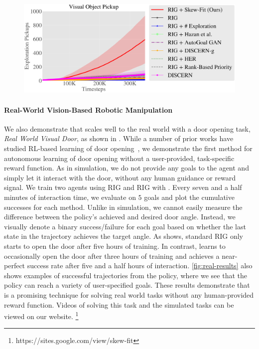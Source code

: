 \begin{figure}[t]
\centering
  \includegraphics[width=\linewidth]{skewfit/figures/plots/exploration_pickups.pdf}
  \label{fig:exploration_pickups}
\end{figure}


\paragraph{Real-World Vision-Based Robotic Manipulation}
We also demonstrate that \METHOD scales well to the real world with a door opening task, \textit{Real World Visual Door}, as shown in .
While a number of prior works have studied RL-based learning of door opening~\cite{kalakrishnan2011learning,chebotar2017path}, we demonstrate the first method for autonomous learning of door opening without a user-provided, task-specific reward function.
As in simulation, we do not provide any goals to the agent and simply let it interact with the door, without any human guidance or reward signal.
We train two agents using RIG and RIG with \METHOD.
Every seven and a half minutes of interaction time, we evaluate on $5$ goals and plot the cumulative successes for each method.
Unlike in simulation, we cannot easily measure the difference between the policy's achieved and desired door angle.
Instead, we visually denote a binary success/failure for each goal based on whether the last state in the trajectory achieves the target angle.
As  shows, standard RIG only starts to open the door after five hours of training.
In contrast, \METHOD learns to occasionally open the door after three hours of training and achieves a near-perfect success rate after five and a half hours of interaction.
\autoref{fig:real-results} also shows examples of successful trajectories from the \METHOD policy, where we see that the policy can reach a variety of user-specified goals.
These results demonstrate that \METHOD is a promising technique for solving real world tasks without any human-provided reward function.
Videos of \METHOD solving this task and the simulated tasks can be viewed on
our website.
\footnote{https://sites.google.com/view/skew-fit}

